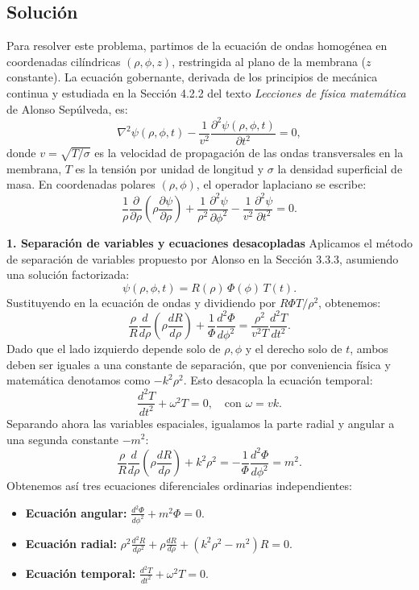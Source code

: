 \documentclass[a4paper]{article}
\begin{document}
\subsection{Solución}
Para resolver este problema, partimos de la ecuación de ondas homogénea en coordenadas cilíndricas $(\rho, \phi, z)$, restringida al plano de la membrana ($z$ constante). La ecuación gobernante, derivada de los principios de mecánica continua y estudiada en la Sección 4.2.2 del texto \textit{Lecciones de física matemática} de Alonso Sepúlveda, es:
$$\nabla^2 \psi(\rho, \phi, t) - \frac{1}{v^2} \frac{\partial^2 \psi(\rho, \phi, t)}{\partial t^2} = 0,$$
donde $v = \sqrt{T/\sigma}$ es la velocidad de propagación de las ondas transversales en la membrana, $T$ es la tensión por unidad de longitud y $\sigma$ la densidad superficial de masa. En coordenadas polares $(\rho, \phi)$, el operador laplaciano se escribe:
$$\frac{1}{\rho} \frac{\partial}{\partial \rho} \left( \rho \frac{\partial \psi}{\partial \rho} \right) + \frac{1}{\rho^2} \frac{\partial^2 \psi}{\partial \phi^2} - \frac{1}{v^2} \frac{\partial^2 \psi}{\partial t^2} = 0.$$

\textbf{1. Separación de variables y ecuaciones desacopladas}
Aplicamos el método de separación de variables propuesto por Alonso en la Sección 3.3.3, asumiendo una solución factorizada:
$$\psi(\rho, \phi, t) = R(\rho) \, \Phi(\phi) \, T(t).$$
Sustituyendo en la ecuación de ondas y dividiendo por $R \Phi T / \rho^2$, obtenemos:
$$\frac{\rho}{R} \frac{d}{d\rho} \left( \rho \frac{dR}{d\rho} \right) + \frac{1}{\Phi} \frac{d^2 \Phi}{d\phi^2} = \frac{\rho^2}{v^2 T} \frac{d^2 T}{dt^2}.$$
Dado que el lado izquierdo depende solo de $\rho, \phi$ y el derecho solo de $t$, ambos deben ser iguales a una constante de separación, que por conveniencia física y matemática denotamos como $-k^2 \rho^2$. Esto desacopla la ecuación temporal:
$$\frac{d^2 T}{dt^2} + \omega^2 T = 0, \quad \text{con } \omega = vk.$$
Separando ahora las variables espaciales, igualamos la parte radial y angular a una segunda constante $-m^2$:
$$\frac{\rho}{R} \frac{d}{d\rho} \left( \rho \frac{dR}{d\rho} \right) + k^2 \rho^2 = - \frac{1}{\Phi} \frac{d^2 \Phi}{d\phi^2} = m^2.$$
Obtenemos así tres ecuaciones diferenciales ordinarias independientes:
\begin{itemize}
\item \textbf{Ecuación angular:} $\displaystyle \frac{d^2 \Phi}{d\phi^2} + m^2 \Phi = 0$.
\item \textbf{Ecuación radial:} $\displaystyle \rho^2 \frac{d^2 R}{d\rho^2} + \rho \frac{dR}{d\rho} + (k^2 \rho^2 - m^2) R = 0$.
\item \textbf{Ecuación temporal:} $\displaystyle \frac{d^2 T}{dt^2} + \omega^2 T = 0$.
\end{itemize}
\end{document}

